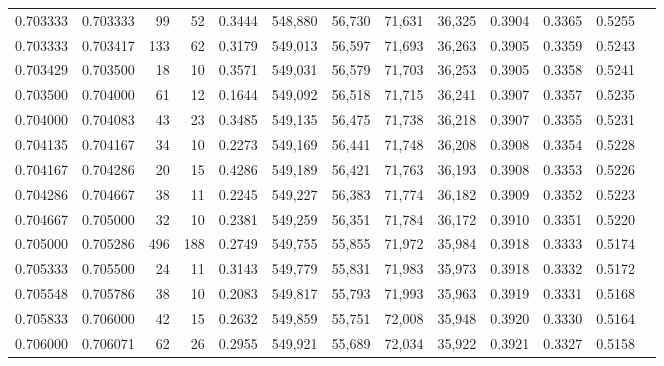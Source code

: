 \begin{tabular}{rrrrrrrrrrrrr}
0.703333 & 0.703333 &    99 &  52 &                                     0.3444 & 548,880 &  56,730 &  71,631 &  36,325 & 0.3904 & 0.3365 & 0.5255 \\
0.703333 & 0.703417 &   133 &  62 &                                     0.3179 & 549,013 &  56,597 &  71,693 &  36,263 & 0.3905 & 0.3359 & 0.5243 \\
0.703429 & 0.703500 &    18 &  10 &                                     0.3571 & 549,031 &  56,579 &  71,703 &  36,253 & 0.3905 & 0.3358 & 0.5241 \\
0.703500 & 0.704000 &    61 &  12 &                                     0.1644 & 549,092 &  56,518 &  71,715 &  36,241 & 0.3907 & 0.3357 & 0.5235 \\
0.704000 & 0.704083 &    43 &  23 &                                     0.3485 & 549,135 &  56,475 &  71,738 &  36,218 & 0.3907 & 0.3355 & 0.5231 \\
0.704135 & 0.704167 &    34 &  10 &                                     0.2273 & 549,169 &  56,441 &  71,748 &  36,208 & 0.3908 & 0.3354 & 0.5228 \\
0.704167 & 0.704286 &    20 &  15 &                                     0.4286 & 549,189 &  56,421 &  71,763 &  36,193 & 0.3908 & 0.3353 & 0.5226 \\
0.704286 & 0.704667 &    38 &  11 &                                     0.2245 & 549,227 &  56,383 &  71,774 &  36,182 & 0.3909 & 0.3352 & 0.5223 \\
0.704667 & 0.705000 &    32 &  10 &                                     0.2381 & 549,259 &  56,351 &  71,784 &  36,172 & 0.3910 & 0.3351 & 0.5220 \\
0.705000 & 0.705286 &   496 & 188 &                                     0.2749 & 549,755 &  55,855 &  71,972 &  35,984 & 0.3918 & 0.3333 & 0.5174 \\
0.705333 & 0.705500 &    24 &  11 &                                     0.3143 & 549,779 &  55,831 &  71,983 &  35,973 & 0.3918 & 0.3332 & 0.5172 \\
0.705548 & 0.705786 &    38 &  10 &                                     0.2083 & 549,817 &  55,793 &  71,993 &  35,963 & 0.3919 & 0.3331 & 0.5168 \\
0.705833 & 0.706000 &    42 &  15 &                                     0.2632 & 549,859 &  55,751 &  72,008 &  35,948 & 0.3920 & 0.3330 & 0.5164 \\
0.706000 & 0.706071 &    62 &  26 &                                     0.2955 & 549,921 &  55,689 &  72,034 &  35,922 & 0.3921 & 0.3327 & 0.5158 \\

\end{tabular}
